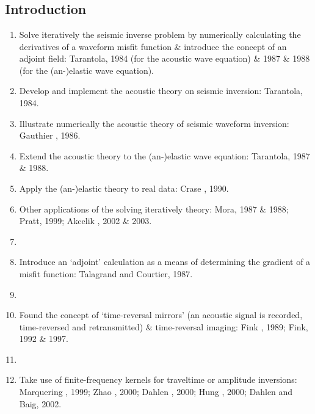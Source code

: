 \renewcommand{\pmk}{Tromp\_2005\_GJI\_Adjoint methods}
\renewcommand{\prf}{FWI/\pmk.pdf}
\renewcommand{\pti}{Seismic tomography, adjoint methods, time reversal and banana-doughnut kernels}
\renewcommand{\pay}{Jeroen Tromp, Carl Tape and Qinya Liu, 2005}
\renewcommand{\pjo}{Geophys. J. Int.}
\renewcommand{\pda}{2016/10/17 Mon.}
\section{\pinfo}
\subsection{Introduction}
\begin{enumerate}[\hspace{10mm}*]
  \item Solve iteratively the seismic inverse problem by numerically calculating the \Frechet derivatives of a waveform misfit function \& introduce the concept of an adjoint field: Tarantola, 1984 (for the acoustic wave equation) \& 1987 \& 1988 (for the (an-)elastic wave equation).
  \item Develop and implement the acoustic theory on seismic inversion: Tarantola, 1984.
  \item Illustrate numerically the acoustic theory of seismic waveform inversion: Gauthier \etal, 1986.
  \item Extend the acoustic theory to the (an-)elastic wave equation: Tarantola, 1987 \& 1988.
  \item Apply the (an-)elastic theory to real data: Crase \etal, 1990.
  \item Other applications of the solving iteratively theory: Mora, 1987 \& 1988; Pratt, 1999; Akcelik \etal, 2002 \& 2003.
  \item \sline
  \item Introduce an `adjoint' calculation as a means of determining the gradient of a misfit function: Talagrand and Courtier, 1987.
  \item \sline
  \item Found the concept of `time-reversal mirrors' (an acoustic signal is recorded, time-reversed and retransmitted) \& time-reversal imaging: Fink \etal, 1989; Fink, 1992 \& 1997.
  \item \sline
  \item Take use of finite-frequency kernels for traveltime or amplitude inversions: Marquering \etal, 1999; Zhao \etal, 2000; Dahlen \etal, 2000; Hung \etal, 2000; Dahlen and Baig, 2002.

\end{enumerate}
